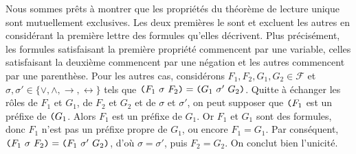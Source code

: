 \documentclass[./main]{subfiles}
\begin{document}
\begin{prv}
    Nous sommes prêts à montrer que les propriétés du théorème de lecture unique sont mutuellement exclusives.
    Les deux premières le sont et excluent les autres en considérant la première lettre des formules qu'elles décrivent.
    Plus précisément, les formules satisfaisant la première propriété commencent par une variable, celles satisfaisant la deuxième commencent par une négation et les autres commencent par une parenthèse.
    Pour les autres cas, considérons $F_1, F_2, G_1, G_2 \in \mathcal{F}$ et $\sigma, \sigma' \in \{\lor, \land, \to, \leftrightarrow\}$ tels que $\verb|(| F_1\ \sigma\ F_2 \verb|)| = \verb|(| G_1\ \sigma'\ G_2 \verb|)|$.
    Quitte à échanger les rôles de $F_1$ et $G_1$, de $F_2$ et $G_2$ et de $\sigma$ et $\sigma'$, on peut supposer que $\verb|(| F_1$ est un préfixe de $\verb|(| G_1$.
    Alors $F_1$ est un préfixe de $G_1$.
    Or $F_1$ et $G_1$ sont des formules, donc $F_1$ n'est pas un préfixe propre de $G_1$, ou encore $F_1 = G_1$.
    Par conséquent, $\verb|(| F_1\ \sigma\ F_2 \verb|)| = \verb|(| F_1\ \sigma'\ G_2 \verb|)|$, d'où $\sigma = \sigma'$, puis $F_2 = G_2$.
    On conclut bien l'unicité.
  \end{prv}
\end{document}
